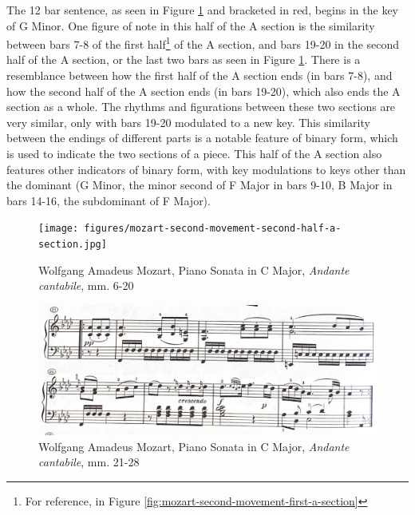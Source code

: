 The 12 bar sentence, as seen in Figure \ref{fig:mozart-second-movement-second-half-a-section}\autocite{Henle_1977} and bracketed in red, begins in the key of G Minor. One figure of note in this half of the A section is the similarity between bars 7-8 of the first half\footnote{For reference, in Figure \ref{fig:mozart-second-movement-first-a-section}} of the A section, and bars 19-20 in the second half of the A section, or the last two bars as seen in Figure \ref{fig:mozart-second-movement-second-half-a-section}\autocite{Henle_1977}. There is a resemblance between how the first half of the A section ends (in bars 7-8), and how the second half of the A section ends (in bars 19-20), which also ends the A section as a whole. The rhythms and figurations between these two sections are very similar, only with bars 19-20 modulated to a new key. This similarity between the endings of different parts is a notable feature of binary form\autocite{Sutcliffe_Tilmouth_2001}, which is used to indicate the two sections of a piece. This half of the A section also features other indicators of binary form, with key modulations to keys other than the dominant (G Minor, the minor second of F Major in bars 9-10, B\musFlat{} Major in bars 14-16, the subdominant of F Major).

\begin{figure}[h]
	\centering
	\texttt{[image: figures/mozart-second-movement-second-half-a-section.jpg]}
	\caption{Wolfgang Amadeus Mozart, Piano Sonata in C Major, \textit{Andante cantabile}, mm. 6-20}
	\label{fig:mozart-second-movement-second-half-a-section}
\end{figure}

\begin{figure}
	\centering
	\includegraphics[width=\textwidth]{figures/mozart-second-movement-b-section-eight-bar-sentence.jpg}
	\caption{Wolfgang Amadeus Mozart, Piano Sonata in C Major, \textit{Andante cantabile}, mm. 21-28}
	\label{fig:mozart-second-movement-b-section-eight-bar-sentence}
\end{figure}

